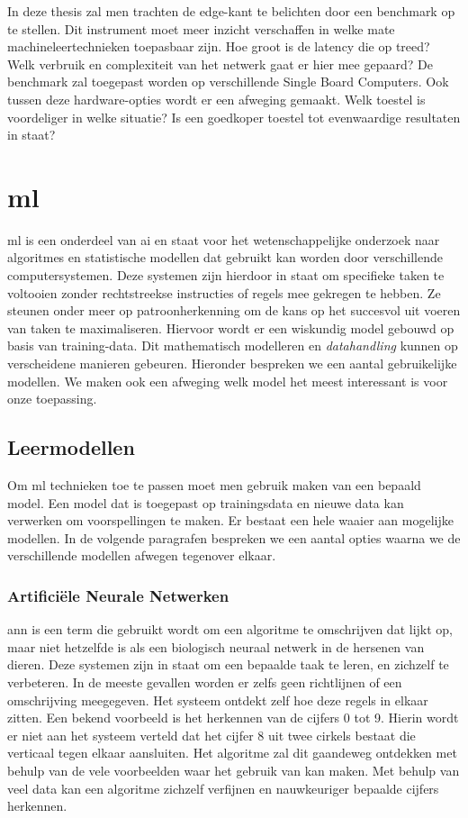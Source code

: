 In deze thesis zal men trachten de edge-kant te belichten door een benchmark op te stellen. Dit instrument moet meer inzicht verschaffen in welke mate machineleertechnieken toepasbaar zijn. Hoe groot is de latency die op treed? Welk verbruik en complexiteit van het netwerk gaat er hier mee gepaard? De benchmark zal toegepast worden op verschillende Single Board Computers. Ook tussen deze hardware-opties wordt er een afweging gemaakt. Welk toestel is voordeliger in welke situatie? Is een goedkoper toestel tot evenwaardige resultaten in staat?



\newpage

\section{\gls{ml}}
\gls{ml} is een onderdeel van \gls{ai} en staat voor het wetenschappelijke onderzoek naar algoritmes en statistische modellen dat gebruikt kan worden door verschillende computersystemen. Deze systemen zijn hierdoor in staat om specifieke taken te voltooien zonder rechtstreekse instructies of regels mee gekregen te hebben. Ze steunen onder meer op patroonherkenning om de kans op het succesvol uit voeren van taken te maximaliseren. Hiervoor wordt er een wiskundig model gebouwd op basis van training-data. Dit mathematisch modelleren en \textit{datahandling} kunnen op verscheidene manieren gebeuren. Hieronder bespreken we een aantal gebruikelijke modellen. We maken ook een afweging welk model het meest interessant is voor onze toepassing. 

\subsection{Leermodellen}
Om \gls{ml} technieken toe te passen moet men gebruik maken van een bepaald model. Een model dat is toegepast op trainingsdata en nieuwe data kan verwerken om voorspellingen te maken. Er bestaat een hele waaier aan mogelijke modellen. In de volgende paragrafen bespreken we een aantal opties waarna we de verschillende modellen afwegen tegenover elkaar.

	\subsubsection{Artifici\"ele Neurale Netwerken}
	\gls{ann} is een term die gebruikt wordt om een algoritme te omschrijven dat lijkt op, maar niet hetzelfde is als een biologisch neuraal netwerk in de hersenen van dieren. Deze systemen zijn in staat om een bepaalde taak te leren, en zichzelf te verbeteren. In de meeste gevallen worden er zelfs geen richtlijnen of een omschrijving meegegeven. Het systeem ontdekt zelf hoe deze regels in elkaar zitten. Een bekend voorbeeld is het herkennen van de cijfers 0 tot 9. Hierin wordt er niet aan het systeem verteld dat het cijfer 8 uit twee cirkels bestaat die verticaal tegen elkaar aansluiten. Het algoritme zal dit gaandeweg ontdekken met behulp van de vele voorbeelden waar het gebruik van kan maken. Met behulp van veel data kan een algoritme zichzelf verfijnen en nauwkeuriger bepaalde cijfers herkennen.
	
